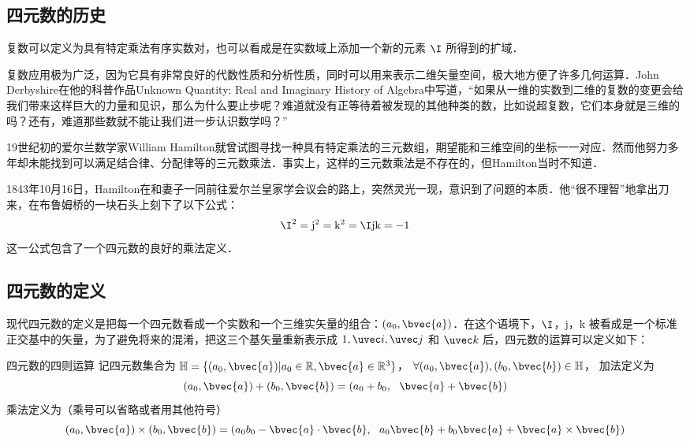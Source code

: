 

\subsection{四元数的历史}

复数可以定义为具有特定乘法有序实数对，也可以看成是在实数域上添加一个新的元素 $  \I$ 所得到的扩域．

复数应用极为广泛，因为它具有非常良好的代数性质和分析性质，同时可以用来表示二维矢量空间，极大地方便了许多几何运算．John Derbyshire在他的科普作品Unknown Quantity: Real and Imaginary History of Algebra中写道，“如果从一维的实数到二维的复数的变更会给我们带来这样巨大的力量和见识，那么为什么要止步呢？难道就没有正等待着被发现的其他种类的数，比如说超复数，它们本身就是三维的吗？还有，难道那些数就不能让我们进一步认识数学吗？”

19世纪初的爱尔兰数学家William Hamilton就曾试图寻找一种具有特定乘法的三元数组，期望能和三维空间的坐标一一对应．然而他努力多年却未能找到可以满足结合律、分配律等的三元数乘法．事实上，这样的三元数乘法是不存在的，但Hamilton当时不知道．

1843年10月16日，Hamilton在和妻子一同前往爱尔兰皇家学会议会的路上，突然灵光一现，意识到了问题的本质．他“很不理智”地拿出刀来，在布鲁姆桥的一块石头上刻下了以下公式：
\begin{equation}
\I^2=\mathrm{j}^2=\mathrm{k}^2=\I\mathrm{j}\mathrm{k}=-1
\end{equation}
这一公式包含了一个四元数的良好的乘法定义．

\subsection{四元数的定义}

现代四元数的定义是把每一个四元数看成一个实数和一个三维实矢量的组合：$(a_0, \bvec{a})$．在这个语境下，$\I$，$\mathrm{j}$，$\mathrm{k}$ 被看成是一个标准正交基中的矢量，为了避免将来的混淆，把这三个基矢量重新表示成 $1, \uvec i, \uvec j$ 和 $\uvec k$ 后，四元数的运算可以定义如下：

\begin{definition}{四元数的四则运算}\label{Quat_def1}
记四元数集合为 $\mathbb{H}=\{(a_0, \bvec{a})|a_0\in\mathbb{R}, \bvec{a}\in\mathbb{R}^3\}$， $\forall(a_0, \bvec{a}), (b_0, \bvec{b})\in\mathbb{H}$， 加法定义为
\begin{equation}
(a_0, \bvec{a})+ (b_0, \bvec{b})=(a_0+b_0,\ \ \bvec{a}+\bvec{b})
\end{equation}
乘法定义为（乘号可以省略或者用其他符号）
\begin{equation}\label{Quat_eq1}
(a_0, \bvec{a})\times (b_0, \bvec{b})=(a_0b_0-\bvec{a}\cdot\bvec{b},\ \ a_0\bvec{b}+b_0\bvec{a}+\bvec{a}\times\bvec{b})
\end{equation}
\end{definition}

